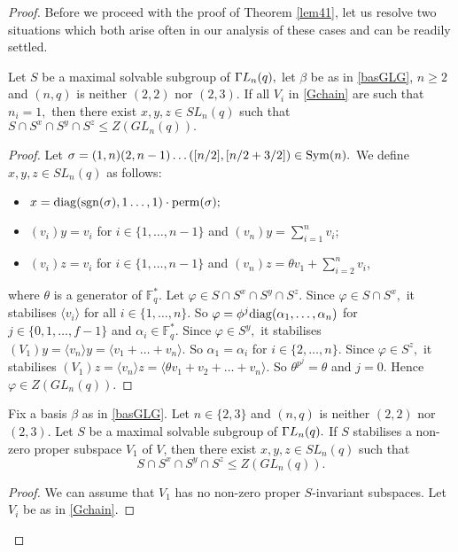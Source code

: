 \begin{proof}

Before we proceed with the proof of Theorem \ref{lem41}, let us resolve two situations which both arise often in our analysis of these cases and can be readily settled.

\begin{Prop}
\label{ni1}
Let $S$ be a maximal solvable subgroup of ${{\Gamma L}}_n(q),$ let $\beta$ be as in \eqref{basGLG},  $n \ge 2$ and $(n,q)$ is neither $(2,2)$ nor $(2,3).$ If  all $V_i$ in \eqref{Gchain} are such that $n_i=1,$ then there exist $x,y,z \in SL_n(q)$ such that $S \cap S^x \cap S^y \cap S^z \le Z(GL_n(q)).$ 
\end{Prop}
\begin{proof}
Let $\sigma =(1, n)(2, n - 1) \ldots ([n/2], [n/2 + 3/2]) \in \mathrm{Sym}(n).$ We define $x,y,z \in SL_n(q)$ as follows:
\begin{itemize}
 \item $x = \mathrm{diag}(\mathrm{sgn}(\sigma), 1\ldots, 1) \cdot \mathrm{perm} (\sigma);$ 
\item $(v_i)y=v_i$ for $i \in \{1, \ldots, n-1\}$ and $(v_n)y= \sum_{i=1}^n v_i$;
\item $(v_i)z=v_i$ for $i \in \{1, \ldots, n-1\}$ and $(v_n)z= \theta v_1 + \sum_{i=2}^n v_i$, 
\end{itemize}
where $\theta$ is a generator of $\mathbb{F}_q^*.$ Let $\varphi \in S \cap S^x \cap S^y \cap S^z.$ Since $\varphi \in S \cap S^x,$ it stabilises $\langle v_i \rangle $ for all $i \in \{1, \ldots, n\}.$ So $\varphi =\phi^j \mathrm{diag}(\alpha_1, \ldots, \alpha_n)$ for $j \in \{0,1, \ldots, f-1\}$ and $\alpha_i \in \mathbb{F}_q^*.$ Since $\varphi \in S^y,$ it stabilises $(V_1)y =\langle v_n \rangle y= \langle v_1 + \ldots +v_n \rangle.$ So $\alpha_1=\alpha_i$ for $i \in \{2, \ldots, n\}.$  Since $\varphi \in S^z,$ it stabilises $(V_1)z =\langle v_n \rangle z= \langle \theta v_1 + v_2 + \ldots +v_n \rangle.$ So $\theta^{p^j}=\theta$ and $j=0.$ Hence $\varphi \in Z(GL_n(q)).$ 
\end{proof}

\begin{Prop}
\label{n3GL}
Fix a basis $\beta$ as in \eqref{basGLG}. Let $n \in \{2,3\}$ and $(n,q)$ is neither $(2,2)$ nor $(2,3)$. Let $S$ be a maximal solvable subgroup of ${{\Gamma L}}_n(q).$ If $S$ stabilises a  non-zero proper subspace $V_1$ of $V$, then there exist $x,y,z \in SL_n(q)$ such that 
 $$S \cap S^x \cap S^y \cap S^z \le Z(GL_n(q)).$$
\end{Prop}
\begin{proof}
We can assume that $V_1$ has no non-zero proper $S$-invariant subspaces. Let $V_i$ be as in \eqref{Gchain}.


\end{proof}
\end{proof}
